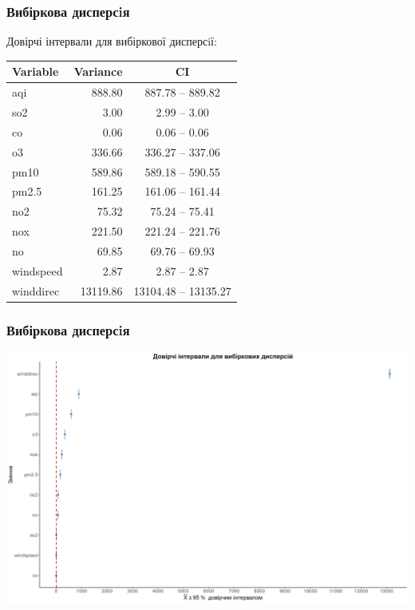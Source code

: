 \documentclass{beamer}
\begin{document}
\begin{frame}
  \frametitle{Вибіркова дисперсiя}

  Довірчі інтервали для вибіркової дисперсiї:

  \begin{table}[ht]
    \centering
    \begin{tabular}{lrc}
      \hline
      Variable  & Variance & CI \\ 
      \hline
      aqi       & 888.80   & 887.78   -- 889.82   \\ 
      so2       & 3.00     & 2.99     -- 3.00     \\ 
      co        & 0.06     & 0.06     -- 0.06     \\ 
      o3        & 336.66   & 336.27   -- 337.06   \\ 
      pm10      & 589.86   & 589.18   -- 590.55   \\ 
      pm2.5     & 161.25   & 161.06   -- 161.44   \\ 
      no2       & 75.32    & 75.24    -- 75.41    \\ 
      nox       & 221.50   & 221.24   -- 221.76   \\ 
      no        & 69.85    & 69.76    -- 69.93    \\ 
      windspeed & 2.87     & 2.87     -- 2.87     \\ 
      winddirec & 13119.86 & 13104.48 -- 13135.27 \\ 
      \hline
    \end{tabular}
  \end{table}
\end{frame}

\begin{frame}
  \frametitle{Вибіркова дисперсiя}

  \begin{center}
    \includegraphics[width=\linewidth]{./plots/lab2/1-4-part/ci-var.png}
  \end{center}
  
\end{frame}
\end{document}
